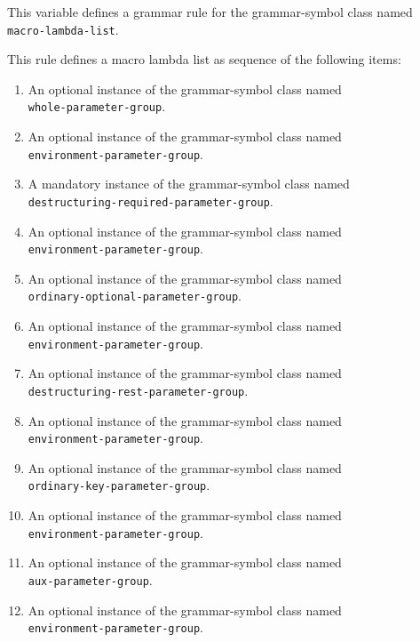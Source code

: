 
This variable defines a grammar rule for the grammar-symbol class
named \texttt{macro-lambda-list}.

This rule defines a macro lambda list as sequence of the
following items:

\begin{enumerate}
\item An optional instance of the grammar-symbol class named\\
  \texttt{whole-parameter-group}.
\item An optional instance of the grammar-symbol class named\\
  \texttt{environment-parameter-group}.
\item A mandatory instance of the grammar-symbol class named\\
  \texttt{destructuring-required-parameter-group}.
\item An optional instance of the grammar-symbol class named\\
  \texttt{environment-parameter-group}.
\item An optional instance of the grammar-symbol class named\\
  \texttt{ordinary-optional-parameter-group}.
\item An optional instance of the grammar-symbol class named\\
  \texttt{environment-parameter-group}.
\item An optional instance of the grammar-symbol class named\\
\texttt{destructuring-rest-parameter-group}.
\item An optional instance of the grammar-symbol class named\\
  \texttt{environment-parameter-group}.
\item An optional instance of the grammar-symbol class named\\
\texttt{ordinary-key-parameter-group}.
\item An optional instance of the grammar-symbol class named\\
  \texttt{environment-parameter-group}.
\item An optional instance of the grammar-symbol class named\\
\texttt{aux-parameter-group}.
\item An optional instance of the grammar-symbol class named\\
  \texttt{environment-parameter-group}.
\end{enumerate}

